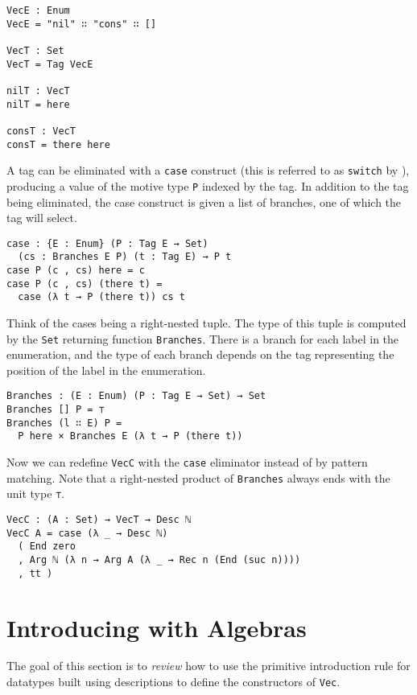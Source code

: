 \documentclass[preprint,nonatbib]{sigplanconf}
\begin{document}
\begin{verbatim}
VecE : Enum
VecE = "nil" ∷ "cons" ∷ []

VecT : Set
VecT = Tag VecE

nilT : VecT
nilT = here

consT : VecT
consT = there here
\end{verbatim}

A tag can be eliminated with a {\tt case} construct (this is referred to
as {\tt switch} by \citet{Chapman:2010:GAL:1932681.1863547,dagand:phd}),
producing a value of the motive type {\tt P} indexed by the tag.
In addition to the tag being eliminated, the case construct is given a
list of branches, one of which the tag will select.

\begin{verbatim}
case : {E : Enum} (P : Tag E → Set)
  (cs : Branches E P) (t : Tag E) → P t
case P (c , cs) here = c
case P (c , cs) (there t) =
  case (λ t → P (there t)) cs t
\end{verbatim}

Think of the cases being a right-nested tuple. The type of this tuple
is computed by the {\tt Set} returning function {\tt Branches}.
There is a branch for each label in the enumeration, and the type of
each branch depends on the tag representing the position of the label
in the enumeration.

\begin{verbatim}
Branches : (E : Enum) (P : Tag E → Set) → Set
Branches [] P = ⊤
Branches (l ∷ E) P =
  P here × Branches E (λ t → P (there t))
\end{verbatim}

Now we can redefine {\tt VecC} with the {\tt case} eliminator instead
of by pattern matching. Note that a right-nested product of
{\tt Branches} always ends with the unit type {\tt ⊤}.

\begin{verbatim}
VecC : (A : Set) → VecT → Desc ℕ
VecC A = case (λ _ → Desc ℕ)
  ( End zero
  , Arg ℕ (λ n → Arg A (λ _ → Rec n (End (suc n))))
  , tt )
\end{verbatim}

\section{Introducing with Algebras}
\label{sec:init}

The goal of this section is to {\it review} how to use the primitive
introduction rule for datatypes built using descriptions to define the
constructors of {\tt Vec}.
\end{document}
